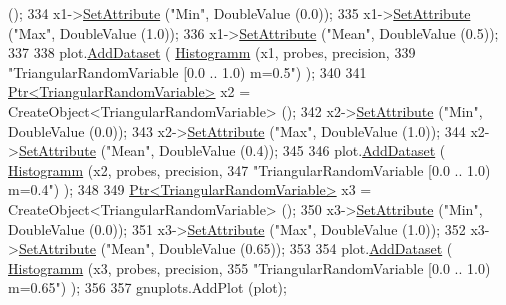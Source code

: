 \begin{DoxyCode}
      ();
334     x1->\hyperlink{classns3_1_1ObjectBase_ac60245d3ea4123bbc9b1d391f1f6592f}{SetAttribute} (\textcolor{stringliteral}{"Min"}, DoubleValue (0.0));
335     x1->\hyperlink{classns3_1_1ObjectBase_ac60245d3ea4123bbc9b1d391f1f6592f}{SetAttribute} (\textcolor{stringliteral}{"Max"}, DoubleValue (1.0));
336     x1->\hyperlink{classns3_1_1ObjectBase_ac60245d3ea4123bbc9b1d391f1f6592f}{SetAttribute} (\textcolor{stringliteral}{"Mean"}, DoubleValue (0.5));
337 
338     plot.\hyperlink{classns3_1_1Gnuplot_a306ec724a327cf9ab699700f31fca0a1}{AddDataset} ( \hyperlink{main-random-variable_8cc_a2cfd3837ab3f2e816cf53486d7a186b5}{Histogramm} (x1, probes, precision,
339                                   \textcolor{stringliteral}{"TriangularRandomVariable [0.0 .. 1.0) m=0.5"}) );
340 
341     \hyperlink{classns3_1_1Ptr}{Ptr<TriangularRandomVariable>} x2 = CreateObject<TriangularRandomVariable> 
      ();
342     x2->\hyperlink{classns3_1_1ObjectBase_ac60245d3ea4123bbc9b1d391f1f6592f}{SetAttribute} (\textcolor{stringliteral}{"Min"}, DoubleValue (0.0));
343     x2->\hyperlink{classns3_1_1ObjectBase_ac60245d3ea4123bbc9b1d391f1f6592f}{SetAttribute} (\textcolor{stringliteral}{"Max"}, DoubleValue (1.0));
344     x2->\hyperlink{classns3_1_1ObjectBase_ac60245d3ea4123bbc9b1d391f1f6592f}{SetAttribute} (\textcolor{stringliteral}{"Mean"}, DoubleValue (0.4));
345 
346     plot.\hyperlink{classns3_1_1Gnuplot_a306ec724a327cf9ab699700f31fca0a1}{AddDataset} ( \hyperlink{main-random-variable_8cc_a2cfd3837ab3f2e816cf53486d7a186b5}{Histogramm} (x2, probes, precision,
347                                   \textcolor{stringliteral}{"TriangularRandomVariable [0.0 .. 1.0) m=0.4"}) );
348 
349     \hyperlink{classns3_1_1Ptr}{Ptr<TriangularRandomVariable>} x3 = CreateObject<TriangularRandomVariable> 
      ();
350     x3->\hyperlink{classns3_1_1ObjectBase_ac60245d3ea4123bbc9b1d391f1f6592f}{SetAttribute} (\textcolor{stringliteral}{"Min"}, DoubleValue (0.0));
351     x3->\hyperlink{classns3_1_1ObjectBase_ac60245d3ea4123bbc9b1d391f1f6592f}{SetAttribute} (\textcolor{stringliteral}{"Max"}, DoubleValue (1.0));
352     x3->\hyperlink{classns3_1_1ObjectBase_ac60245d3ea4123bbc9b1d391f1f6592f}{SetAttribute} (\textcolor{stringliteral}{"Mean"}, DoubleValue (0.65));
353 
354     plot.\hyperlink{classns3_1_1Gnuplot_a306ec724a327cf9ab699700f31fca0a1}{AddDataset} ( \hyperlink{main-random-variable_8cc_a2cfd3837ab3f2e816cf53486d7a186b5}{Histogramm} (x3, probes, precision,
355                                   \textcolor{stringliteral}{"TriangularRandomVariable [0.0 .. 1.0) m=0.65"}) );
356 
357     gnuplots.AddPlot (plot);

\end{DoxyCode}
